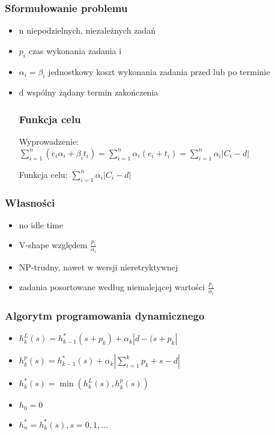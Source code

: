 \documentclass[12pt,a4paper]{article}
\begin{document}
\subsubsection{Sformułowanie problemu}
\begin{itemize}
\item n niepodzielnych, niezależnych zadań
\item $p_{i}$ czas wykonania zadania i
\item $\alpha_{i} =\beta_{i}$ jednostkowy koszt wykonania zadania przed lub po terminie
\item d wspólny żądany termin zakończenia
\subsubsection{Funkcja celu}
Wyprowadzenie: $\sum\limits_{i=1}^{n}(e_{i}\alpha_{i}+\beta_{i}t_{i}) = \sum\limits_{i=1}^{n}\alpha_{i}(e_{i}+t_{i}) = \sum\limits_{i=1}^{n}\alpha_{i}\left | C_{i} - d \right |$

Funkcja celu: $\sum\limits_{i=1}^{n}\alpha_{i}\left | C_{i} - d \right |$
\end{itemize}
\subsubsection{Własności}
\begin{itemize}
\item no idle time
\item V-shape względem $\frac{p_{i}}{\alpha_{i}}$
\item NP-trudny, nawet w wersji nieretryktywnej
\item zadania posortowane według niemalejącej wartości $\frac{p_{i}}{\alpha_{i}}$
\end{itemize}
\subsubsection{Algorytm programowania dynamicznego}
\begin{itemize}
\item $h_{k}^{L}(s) = h_{k-1}^{*}(s+p_{k}) + \alpha_{k} \left | d-(s+p_{k} \right |$
\item $h_{k}^{p}(s) = h_{k-1}^{*}(s) + \alpha_{k} \left | \sum\limits_{i=1}^{k} p_{k}+s-d \right |$
\item $h_{k}^{*}(s)=\min(h_{k}^{L}(s), h_{k}^{p}(s))$
\item $h_{0}=0$
\item $h_{n}^{*} = {h_{k}^{*}(s), s=0,1,...}$
\end{itemize}
\end{document}

